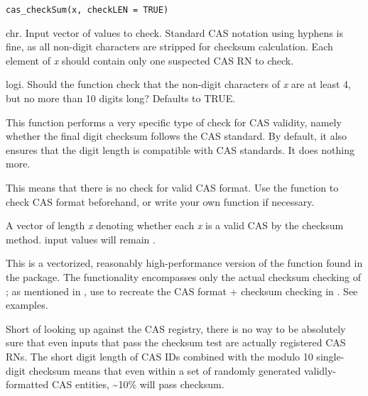 \documentclass[letterpaper]{book}
\begin{document}
\begin{Usage}
\begin{verbatim}
cas_checkSum(x, checkLEN = TRUE)
\end{verbatim}
\end{Usage}
%
\begin{Arguments}
\begin{ldescription}
\item[\code{x}] chr. Input vector of values to check. Standard CAS notation using hyphens is fine, as
all non-digit characters are stripped for checksum calculation. Each element of \emph{x} should contain
only one suspected CAS RN to check.

\item[\code{checkLEN}] logi. Should the function check that the non-digit characters of \emph{x} are at least 4, but no
more than 10 digits long? Defaults to TRUE.
\end{ldescription}
\end{Arguments}
%
\begin{Details}\relax
This function performs a very specific type of check for CAS validity, namely whether the final digit checksum follows
the CAS standard. By default, it also ensures that the digit length is compatible with CAS standards. It does nothing
more.

This means that there is no check for valid CAS format. Use the  function to check CAS
format beforehand, or write your own function if necessary.
\end{Details}
%
\begin{Value}
A  vector of length \emph{x} denoting whether each \emph{x} is a valid CAS by the checksum method. 
input values will remain .
\end{Value}
%
\begin{Note}\relax
This is a vectorized, reasonably high-performance version of the  function found
in the  package. The functionality encompasses only the actual checksum checking of ;
as mentioned in , use  to recreate the CAS format + checksum checking in
. See examples.

Short of looking up against the CAS registry, there is no way to be absolutely sure that even inputs that pass
the checksum test are actually registered CAS RNs. The short digit length of CAS IDs combined with the modulo 10 single-
digit checksum means that even within a set of randomly generated validly-formatted CAS entities, \textasciitilde{}10\% will pass checksum.
\end{Note}
\end{document}
